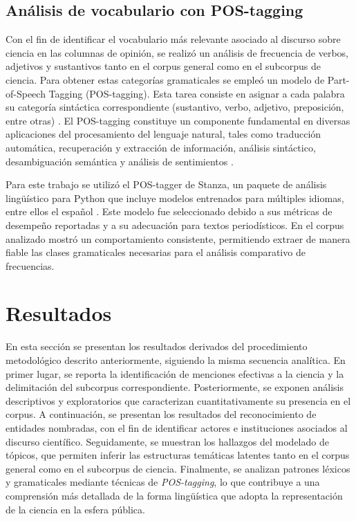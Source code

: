 \documentclass[11pt,a4paper]{article}
\begin{document}
	\subsection{Análisis de vocabulario con POS-tagging}
	Con el fin de identificar el vocabulario más relevante asociado al discurso sobre ciencia en las columnas de opinión, se realizó un análisis de frecuencia de verbos, adjetivos y sustantivos tanto en el corpus general como en el subcorpus de ciencia. Para obtener estas categorías gramaticales se empleó un modelo de Part-of-Speech Tagging (POS-tagging). Esta tarea consiste en asignar a cada palabra su categoría sintáctica correspondiente (sustantivo, verbo, adjetivo, preposición, entre otras) \cite{he2020surveyrecentadvancessequence}. El POS-tagging constituye un componente fundamental en diversas aplicaciones del procesamiento del lenguaje natural, tales como traducción automática, recuperación y extracción de información, análisis sintáctico, desambiguación semántica y análisis de sentimientos \cite{Chiche2022}.
	
	Para este trabajo se utilizó el POS-tagger de Stanza, un paquete de análisis lingüístico para Python que incluye modelos entrenados para múltiples idiomas, entre ellos el español \cite{qi2020stanzapythonnaturallanguage}. Este modelo fue seleccionado debido a sus métricas de desempeño reportadas y a su adecuación para textos periodísticos. En el corpus analizado mostró un comportamiento consistente, permitiendo extraer de manera fiable las clases gramaticales necesarias para el análisis comparativo de frecuencias.
	
	\section{Resultados}


En esta sección se presentan los resultados derivados del procedimiento metodológico descrito anteriormente, siguiendo la misma secuencia analítica. En primer lugar, se reporta la identificación de menciones efectivas a la ciencia y la delimitación del subcorpus correspondiente. Posteriormente, se exponen análisis descriptivos y exploratorios que caracterizan cuantitativamente su presencia en el corpus. A continuación, se presentan los resultados del reconocimiento de entidades nombradas, con el fin de identificar actores e instituciones asociados al discurso científico. Seguidamente, se muestran los hallazgos del modelado de tópicos, que permiten inferir las estructuras temáticas latentes tanto en el corpus general como en el subcorpus de ciencia. Finalmente, se analizan patrones léxicos y gramaticales mediante técnicas de \emph{POS-tagging}, lo que contribuye a una comprensión más detallada de la forma lingüística que adopta la representación de la ciencia en la esfera pública.
\end{document}
